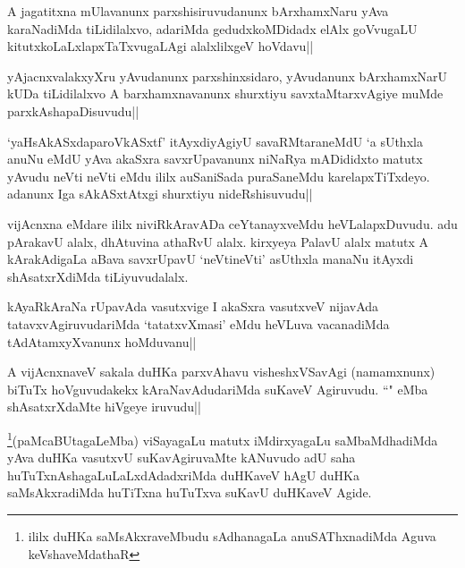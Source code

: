 \begin{artha}
A jagatitxna mUlavanunx parxshisiruvudanunx bArxhamxNaru yAva karaNadiMda tiLidilalxvo, adariMda gedudxkoMDidadx elAlx goVvugaLU kitutxkoLaLxlapxTaTxvugaLAgi alalxlilxgeV hoVdavu||
\end{artha}

\begin{artha}%
yAjacnxvalakxyXru yAvudanunx parxshinxsidaro, yAvudanunx bArxhamxNarU kUDa tiLidilalxvo A barxhamxnavanunx shurxtiyu savxtaMtarxvAgiye muMde parxkAshapaDisuvudu||
\end{artha}

\begin{artha}
`yaHsAkASxdaparoVkASxtf' itAyxdiyAgiyU savaRMtaraneMdU `a sUthxla anuNu eMdU yAva akaSxra savxrUpavanunx niNaRya mADididxto matutx yAvudu neVti neVti eMdu ililx auSaniSada puraSaneMdu karelapxTiTxdeyo. adanunx Iga sAkASxtAtxgi shurxtiyu nideRshisuvudu||
\end{artha}

\begin{artha}
vijAcnxna eMdare ililx niviRkAravADa ceYtanayxveMdu heVLalapxDuvudu. adu pArakavU alalx, dhAtuvina athaRvU alalx. kirxyeya PalavU alalx matutx A kArakAdigaLa aBava savxrUpavU `neVtineVti' asUthxla manaNu itAyxdi shAsatxrXdiMda tiLiyuvudalalx.
\end{artha}


\begin{artha}
kAyaRkAraNa rUpavAda vasutxvige I akaSxra vasutxveV nijavAda tatavxvAgiruvudariMda `tatatxvXmasi' eMdu heVLuva vacanadiMda tAdAtamxyXvanunx hoMduvanu||
\end{artha}


\begin{artha}
A vijAcnxnaveV sakala duHKa parxvAhavu visheshxVSavAgi (namamxnunx) biTuTx hoVguvudakekx kAraNavAdudariMda suKaveV Agiruvudu. ``\stext " eMba shAsatxrXdaMte hiVgeye iruvudu||
\end{artha}
\begin{artha}
\footnote[1]{ililx duHKa saMsAkxraveMbudu sAdhanagaLa anuSAThxnadiMda Aguva keVshaveMdathaR}(paMcaBUtagaLeMba) viSayagaLu matutx iMdirxyagaLu saMbaMdhadiMda yAva duHKa vasutxvU suKavAgiruvaMte kANuvudo adU saha huTuTxnAshagaLuLaLxdAdadxriMda duHKaveV hAgU duHKa saMsAkxradiMda huTiTxna huTuTxva suKavU duHKaveV Agide.
\end{artha}

